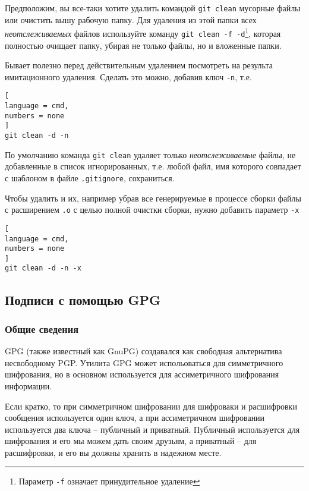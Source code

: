 \documentclass[%
	11pt,
	a4paper,
	utf8,
		]{article}
\begin{document}
Предположим, вы все-таки хотите удалить командой \lstinline{git clean} мусорные файлы или очистить вышу рабочую папку. Для удаления из этой папки всех \emph{неотслеживаемых} файлов используйте команду \lstinline{git clean -f -d}\footnote{Параметр \lstinline{-f} означает принудительное удаление}, которая полностью очищает папку, убирая не только файлы, но и вложенные папки.

Бывает полезно перед действительным удалением посмотреть на результа имитационного удаления. Сделать это можно, добавив ключ \lstinline{-n}, т.е.


\begin{lstlisting}[
language = cmd,
numbers = none
]
git clean -d -n
\end{lstlisting}

По умолчанию команда \lstinline{git clean} удаляет только \emph{неотслеживаемые} файлы, не добавленные в список игнорированных, т.е. любой файл, имя которого совпадает с шаблоном в файле \texttt{.gitignore}, сохраниться.

Чтобы удалить и их, например убрав все генерируемые в процессе сборки файлы с расширением \texttt{.o} с целью полной очистки сборки, нужно добавить параметр \lstinline{-x}


\begin{lstlisting}[
language = cmd,
numbers = none
]
git clean -d -n -x
\end{lstlisting}


\subsection{Подписи с помощью GPG}

\subsubsection{Общие сведения}

GPG (также известный как GnuPG) создавался как свободная альтернатива несвободному PGP. Утилита GPG может испольоваться для симметричного шифрования, но в основном используется для ассиметричного шифрования информации.

Если кратко, то при симметричном шифровании для шифроваки и расшифровки сообщения используется один ключ, а при ассиметричном шифровании используется два ключа -- публичный и приватный. Публичный используется для шифрования и его мы можем дать своим друзьям, а приватный -- для расшифровки, и его вы должны хранить в надежном месте.
\end{document}
